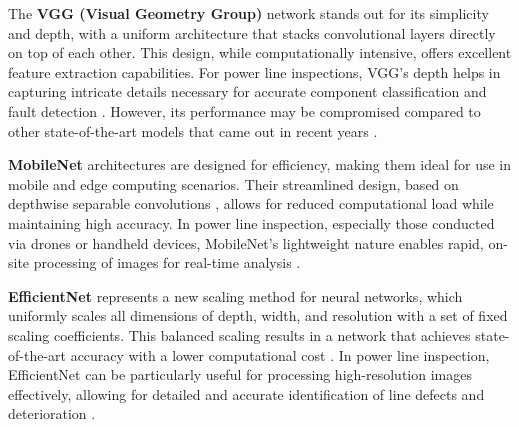 The \textbf{VGG (Visual Geometry Group)} \cite{simonyan2014very} network stands out for its simplicity and depth, with a uniform architecture that stacks convolutional layers directly on top of each other. This design, while computationally intensive, offers excellent feature extraction capabilities. For power line inspections, VGG's depth helps in capturing intricate details necessary for accurate component classification and fault detection \cite{stefenon_semi_protopnet_2022}. However, its performance may be compromised compared to other state-of-the-art models that came out in recent years \cite{Team}.

\textbf{MobileNet} \cite{howard2017mobilenets} architectures are designed for efficiency, making them ideal for use in mobile and edge computing scenarios. Their streamlined design, based on depthwise separable convolutions \cite{chollet2017xception}, allows for reduced computational load while maintaining high accuracy. In power line inspection, especially those conducted via drones or handheld devices, MobileNet's lightweight nature enables rapid, on-site processing of images for real-time analysis \cite{wei_online_2022, qiu_lightweight_2023, li_improved_2022}.

\textbf{EfficientNet} \cite{tan2019efficientnet} represents a new scaling method for neural networks, which uniformly scales all dimensions of depth, width, and resolution with a set of fixed scaling coefficients. This balanced scaling results in a network that achieves state-of-the-art accuracy with a lower computational cost \cite{Team}. In power line inspection, EfficientNet can be particularly useful for processing high-resolution images effectively, allowing for detailed and accurate identification of line defects and deterioration \cite{odo_aerial_2021, li_pin_2022}.

